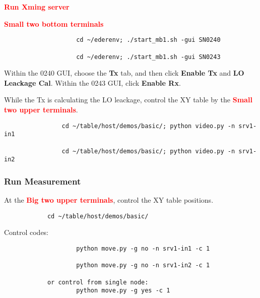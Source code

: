 \documentclass{article}
\begin{document}
        \textbf{\textcolor{red}{\textbf{Run Xming server}}}
        
        \textbf{\textcolor{red}{Small two bottom terminals}}
        
        \begin{verbatim}
                    cd ~/ederenv; ./start_mb1.sh -gui SN0240
                    
                    cd ~/ederenv; ./start_mb1.sh -gui SN0243
        \end{verbatim}
        
        
        
        Within the 0240 GUI, choose the \textbf{Tx} tab, and then click \textbf{Enable Tx} and \textbf{LO Leackage Cal}.
        Within the 0243 GUI, click \textbf{Enable Rx}. 
        
        While the Tx is calculating the LO leackage, control the XY table by the \textbf{\textcolor{red}{Small two upper terminals}}.
        \begin{verbatim}
                cd ~/table/host/demos/basic/; python video.py -n srv1-in1
    
                cd ~/table/host/demos/basic/; python video.py -n srv1-in2
        \end{verbatim}
        
        
        \subsubsection{Run Measurement}
        At the \textbf{\textcolor{red}{Big two upper terminals}}, control the XY table positions. 
        
        \begin{verbatim}
            cd ~/table/host/demos/basic/
        \end{verbatim}
        
        Control codes:
        \begin{verbatim}
                    python move.py -g no -n srv1-in1 -c 1
        
                    python move.py -g no -n srv1-in2 -c 1
            
            or control from single node:
                    python move.py -g yes -c 1
        \end{verbatim}
        
\end{document}
